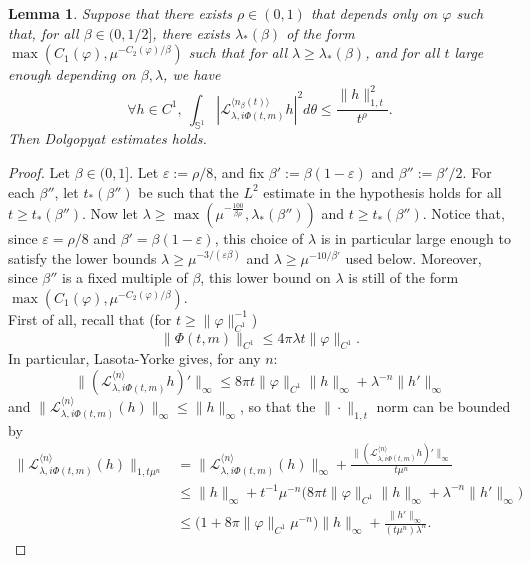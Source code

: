 \documentclass[11pt]{amsart}
\theoremstyle{plain}
\newtheorem{lemma}[theorem]{Lemma}
\theoremstyle{definition}
\numberwithin{equation}{section}
\begin{document}
\begin{lemma}
Suppose that there exists $\rho \in (0,1)$ that depends only on $\varphi$ such that, for all $\beta \in (0,1/2]$, there exists $\lambda_*(\beta)$ of the form $\max(C_1(\varphi),\mu^{-C_2(\varphi)/\beta})$ such that for all $\lambda \geq \lambda_*(\beta)$, and for all $t$ large enough depending on $\beta,\lambda$, we have $$ \forall h \in C^1, \  \int_{\mathbb{S}^1} |\mathcal{L}_{\lambda,i\Phi(t,m)}^{\langle n_\beta(t) \rangle} h|^2 d\theta \leq \frac{\|h\|_{1,t}^2}{t^{\rho}} .$$
Then Dolgopyat estimates holds.
\end{lemma}

\begin{proof}

Let $\beta \in (0,1]$. Let $\varepsilon := \rho/8$, and fix $\beta' := \beta(1-\varepsilon)$ and $\beta'':=\beta'/2$. For each $\beta''$, let $t_*(\beta'')$ be such that the $L^2$ estimate in the hypothesis holds for all $t\geq t_*(\beta'')$. Now let $\lambda \geq \max( \mu^{-\frac{100}{\beta \rho}} ,\lambda_*(\beta''))$ and $t \geq t_*(\beta'')$. Notice that, since $\varepsilon=\rho/8$ and $\beta'=\beta(1-\varepsilon)$, this choice of $\lambda$ is in particular large enough to satisfy the lower bounds $\lambda\geq\mu^{-3/(\varepsilon\beta)}$ and $\lambda\geq\mu^{-10/\beta'}$ used below. Moreover, since $\beta''$ is a fixed multiple of $\beta$, this lower bound on $\lambda$ is still of the form $\max(C_1(\varphi),\mu^{-C_2(\varphi)/\beta})$. \\
First of all, recall that (for $t \geq \|\varphi\|_{C^1}^{-1}$) $$ \|\Phi(t,m)\|_{C^1} \leq 4 \pi \lambda t \|\varphi\|_{C^1}. $$
In particular, Lasota-Yorke gives, for any $n$:
$$ \|(\mathcal{L}_{\lambda,i\Phi(t,m)}^{\langle n \rangle}h)'\|_\infty \leq 8 \pi t \| \varphi \|_{C^1} \|h\|_\infty + \lambda^{-n}\| h' \|_\infty$$
and  $\|\mathcal{L}_{\lambda,i\Phi(t,m)}^{\langle n \rangle}(h)\|_\infty \leq \|h\|_\infty$, so that the $\|\cdot \|_{1,t}$ norm can be bounded by
\begin{align*}
\|\mathcal{L}_{\lambda,i\Phi(t,m)}^{\langle n \rangle}(h)\|_{1,t \mu^{n}} &=  \|\mathcal{L}_{\lambda,i\Phi(t,m)}^{\langle n \rangle}(h)\|_{\infty}  + \frac{\|(\mathcal{L}_{\lambda,i\Phi(t,m)}^{\langle n \rangle} h)'\|_\infty}{t \mu^{n}}   \\
& \leq \|h\|_{\infty}  + t^{-1} \mu^{-n} \Big( 8 \pi t \| \varphi \|_{C^1} \|h\|_\infty + \lambda^{-n}\| h' \|_\infty \Big)  \\
& \leq \big(1+8\pi \|\varphi\|_{C^1} \mu^{-n} \big) \|h\|_\infty + \frac{\|h'\|_\infty}{(t \mu^n) \lambda^n} .

\end{align*}
\end{proof}
\end{document}
